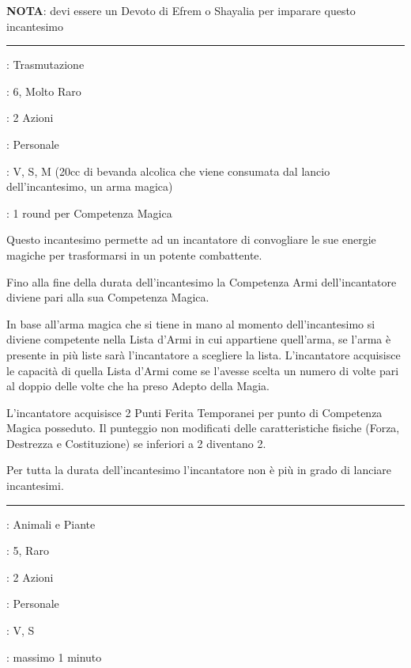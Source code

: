 \begin{multicols}{2}
\textbf{NOTA}: devi essere un Devoto di Efrem o Shayalia per imparare questo incantesimo

\smallskip\noindent\rule{\linewidth}{2pt} \hypertarget{Trasformazione Furiosa di Restser}{}\medskip{}
\noindent
\begin{description}[noitemsep, topsep=0pt, parsep=0pt, partopsep=0pt, leftmargin=0cm, labelwidth=2.8cm]
	\item[\textbf{Lista di Magia}]: Trasmutazione
	\item[\textbf{Livello}]: 6, Molto Raro
	\item[\textbf{T. di Lancio}]: 2 Azioni
	\item[\textbf{Gittata}]: Personale
	\item[\textbf{Componenti}]: V, S, M (20cc di bevanda alcolica che viene consumata dal lancio dell'incantesimo, un arma magica)
	\item[\textbf{Durata}]: 1 round per Competenza Magica
\end{description}

Questo incantesimo permette ad un incantatore di convogliare le sue energie magiche per trasformarsi in un potente combattente.

Fino alla fine della durata dell'incantesimo la Competenza Armi dell'incantatore diviene pari alla sua Competenza Magica.

In base all'arma magica che si tiene in mano al momento dell'incantesimo si diviene competente nella Lista d'Armi in cui appartiene quell'arma, se l'arma è presente in più liste sarà l'incantatore a scegliere la lista. L'incantatore acquisisce le capacità di quella Lista d'Armi come se l'avesse scelta un numero di volte pari al doppio delle volte che ha preso Adepto della Magia.

L'incantatore acquisisce 2 Punti Ferita Temporanei per punto di Competenza Magica posseduto.
Il punteggio non modificati delle caratteristiche fisiche (Forza, Destrezza e Costituzione) se inferiori a 2 diventano 2.

Per tutta la durata dell'incantesimo l'incantatore non è più in grado di lanciare incantesimi.

\smallskip\noindent\rule{\linewidth}{2pt} \hypertarget{Traslazione Arborea}{}\medskip{}
\noindent
\begin{description}[noitemsep, topsep=0pt, parsep=0pt, partopsep=0pt, leftmargin=0cm, labelwidth=2.8cm]
	\item[\textbf{Lista di Magia}]: Animali e Piante
	\item[\textbf{Livello}]: 5, Raro
	\item[\textbf{T. di Lancio}]: 2 Azioni
	\item[\textbf{Gittata}]: Personale
	\item[\textbf{Componenti}]: V, S
	\item[\textbf{Durata}]: massimo 1 minuto
\end{description}


\end{multicols}
